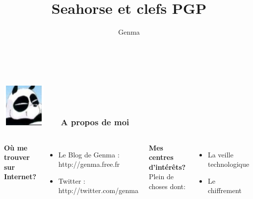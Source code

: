\documentclass{beamer}
\title[Seahorse et clefs PGP]{Seahorse et clefs PGP}
\author{Genma}
\begin{document}
\begin{frame}
	\titlepage
	\vfill
	\begin{center}
		\\[2.5ex]
		{\tiny\CcNote{\CcLongnameByNcSa}}
		\vspace*{-2.5ex}
	\end{center}
\end{frame}





\begin{frame}
\frametitle{\includegraphics[scale=0.4]{./images/Genma.jpg} \ \ \  A propos de moi  }
\begin{columns}[c] 

\textbf{Où me trouver sur Internet?}
\begin{itemize}
\item Le Blog de Genma : http://genma.free.fr
\item Twitter : http://twitter.com/genma
\end{itemize}

\textbf{Mes centres d'intérêts?}
\\ Plein de choses dont:
\begin{itemize}
\item La veille technologique
\item Le chiffrement
\end{itemize}

\includegraphics[width=5cm,height=5cm]{./images/blog.png} 

\end{columns}
\end{frame}
\end{document}
